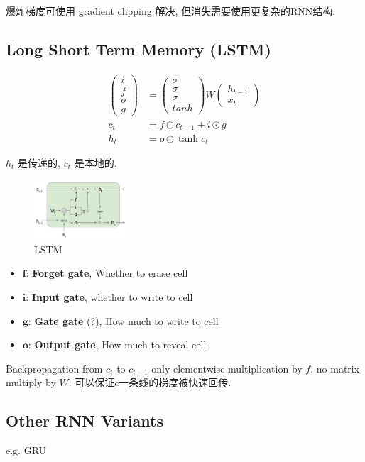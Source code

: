 爆炸梯度可使用 gradient clipping 解决, 但消失需要使用更复杂的RNN结构. 
\subsection{Long Short Term Memory (LSTM)}

\begin{align*}
    \begin{pmatrix}
        i\\f\\o\\g
    \end{pmatrix}&=\begin{pmatrix}
        \sigma \\ \sigma \\ \sigma \\ 
        tanh
    \end{pmatrix}W\begin{pmatrix}
        h_{t-1}\\x_t
    \end{pmatrix}\\
    c_t&=f\odot c_{t-1} + i\odot g\\
    h_t&=o\odot \tanh c_t
\end{align*}

$h_t$ 是传递的, $c_t$ 是本地的. 

\begin{figure}[!htb]
    \centering
    \includegraphics[width=0.309\textwidth]{pic/Lec10/LSTM.png}
    \caption{LSTM}
\end{figure}

\begin{itemize}
    \item $\mathbf{f}$: \textbf{Forget gate}, Whether to erase cell
    \item $\mathbf{i}$: \textbf{Input gate}, whether to write to cell
    \item $\mathbf{g}$: \textbf{Gate gate} (?), How much to write to cell
    \item $\mathbf{o}$: \textbf{Output gate}, How much to reveal cell    
\end{itemize}

Backpropagation from $c_t$ to $c_{t-1}$ only elementwise multiplication by $f$, no matrix multiply by $W$. 可以保证$c$一条线的梯度被快速回传. 

\subsection{Other RNN Variants}
e.g. GRU
